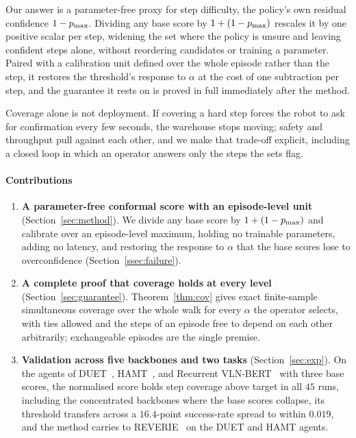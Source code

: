 Our answer is a parameter-free proxy for step difficulty, the policy's own
residual confidence $1-p_{\max}$. Dividing any base score by $1+(1-p_{\max})$
rescales it by one positive scalar per step, widening the set where the policy
is unsure and leaving confident steps alone, without reordering candidates
or training a parameter. Paired with a calibration
unit defined over the whole episode rather than the step, it restores the
threshold's response to $\alpha$ at the cost of one subtraction per step, and
the guarantee it rests on is proved in full immediately after the method.

Coverage alone is not deployment. If covering a hard step forces the robot
to ask for confirmation every few seconds, the warehouse stops moving;
safety and throughput pull against each other, and we make that trade-off
explicit, including a closed loop in which an operator answers only the
steps the sets flag.

\paragraph*{Contributions}
\begin{enumerate}
\item \textbf{A parameter-free conformal score with an episode-level unit}
(Section~\ref{sec:method}). We divide any base score by $1+(1-p_{\max})$ and
calibrate over an episode-level maximum, holding no trainable parameters,
adding no latency, and restoring the response to $\alpha$ that the base
scores lose to overconfidence (Section~\ref{ssec:failure}).
\item \textbf{A complete proof that coverage holds at every level}
(Section~\ref{sec:guarantee}). Theorem~\ref{thm:cov} gives exact finite-sample
simultaneous coverage over the whole walk for every $\alpha$ the operator
selects, with ties allowed and the steps of an episode free to depend on each
other arbitrarily; exchangeable episodes are the single premise.
\item \textbf{Validation across five backbones and two tasks}
(Section~\ref{sec:exp}). On the agents of DUET~\cite{chen2022duet},
HAMT~\cite{chen2021hamt}, and Recurrent VLN-BERT~\cite{hong2021vlnbert} with
three base scores, the normalised score holds step coverage above target in all
$45$ runs, including the concentrated backbones where the base scores collapse,
its threshold transfers across a $16.4$-point success-rate spread to within
$0.019$, and the method carries to REVERIE~\cite{qi2020reverie} on the DUET
and HAMT agents.
\end{enumerate}
